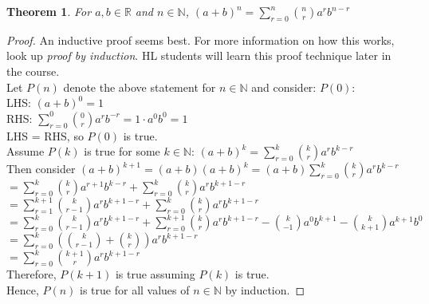 \documentclass[12pt, a4paper, titlepage, twoside]{article}
\newcommand*{\N}{\mathbb{N}}
\newcommand*{\R}{\mathbb{R}}
\newtheorem*{theorem*}{Theorem}
\begin{document}
	\begin{pf}
		\begin{theorem*}
			For $a,b \in \R$ and $n \in \N$, $\displaystyle (a+b)^n =  \sum_{r=0}^n {n \choose r} a^r b^{n-r}$
		\end{theorem*}
		
		\tcbline
		
		\begin{proof}
			An inductive proof seems best. For more information on how this works, look up \textit{proof by induction}. HL students will
			learn this proof technique later in the course.\\
			
			Let $P(n)$ denote the above statement for $n \in \N$ and consider: $P(0)$:\\
			
			LHS: $(a+b)^0 = 1$\\
			RHS: $\displaystyle \sum_{r=0}^0 {0 \choose r}  a^r b^{-r} = 1 \cdot a^0 b^0 = 1$\\
			
			LHS = RHS, so $P(0)$ is true.\\
			
			Assume $P(k)$ is true for some $k \in \N$: $\displaystyle (a+b)^k = \sum_{r=0}^k {k \choose r} a^r b^{k-r}$\\
			
			Then consider $\displaystyle (a+b)^{k+1} = (a+b) (a+b)^k = (a+b) \sum_{r=0}^k {k \choose r} a^r b^{k-r}$\\
			
			$\displaystyle = \sum_{r=0}^k {k \choose r} a^{r+1} b^{k-r} + \sum_{r=0}^k {k \choose r} a^r b^{k+1-r}$\\
			
			$\displaystyle = \sum_{r=1}^{k+1} {k \choose {r-1}} a^r b^{k+1-r} + \sum_{r=0}^k {k \choose r} a^r b^{k+1-r}$\\
			
			$\displaystyle = \sum_{r=0}^k {k \choose {r-1}} a^r b^{k+1-r} + \sum_{r=0}^{k+1} {k \choose r} a^r b^{k+1-r} 
			- {k \choose {-1}} a^0 b^{k+1} - {k \choose {k+1}} a^{k+1} b^0$\\
			
			$\displaystyle = \sum_{r=0}^k \left({k \choose {r-1}} + {k \choose r}\right) a^r b^{k+1-r}$\\
			
			$\displaystyle = \sum_{r=0}^k {{k+1} \choose r} a^r b^{k+1-r}$\\
			
			Therefore, $P(k+1)$ is true assuming $P(k)$ is true.\\
			
			Hence, $P(n)$ is true for all values of $n \in \N$ by induction.
		\end{proof}
	\end{pf} 
	
\end{document}
